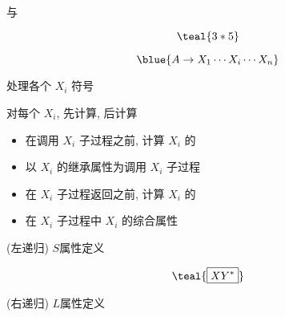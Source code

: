 \begin{frame}{}
  \begin{center}
     与 

    \vspace{0.30cm}
    \vspace{-0.20cm}
    \[
      \teal{3 \ast 5}
    \]

    \pause
    \vspace{-0.50cm}
    \[
      \blue{A \to X_{1} \cdots X_{i} \cdots X_{n}}
    \]

     处理各个 $X_{i}$ 符号

    \vspace{0.10cm}
    对每个 $X_{i}$, 先计算, 后计算
  \end{center}
\end{frame}

\begin{frame}{}
  \begin{center}

    \vspace{0.80cm}
    \begin{itemize}
      \centering
      \setlength{\itemsep}{15pt}
      \item 在调用 $X_{i}$ 子过程之前, 计算 $X_{i}$ 的
      \item 以 $X_{i}$ 的继承属性为调用 $X_{i}$ 子过程
      \item 在 $X_{i}$ 子过程返回之前, 计算 $X_{i}$ 的
      \item 在 $X_{i}$ 子过程中 $X_{i}$ 的综合属性
    \end{itemize}
  \end{center}
\end{frame}

\begin{frame}{}
  \begin{center}
    (左递归) $S$属性定义
    \vspace{-0.50cm}
    

    \vspace{-0.60cm}
    \[
      \teal{\boxed{X Y^{\ast}}}
    \]

    (右递归) $L$属性定义
    \vspace{-0.50cm}
    
  \end{center}
\end{frame}

